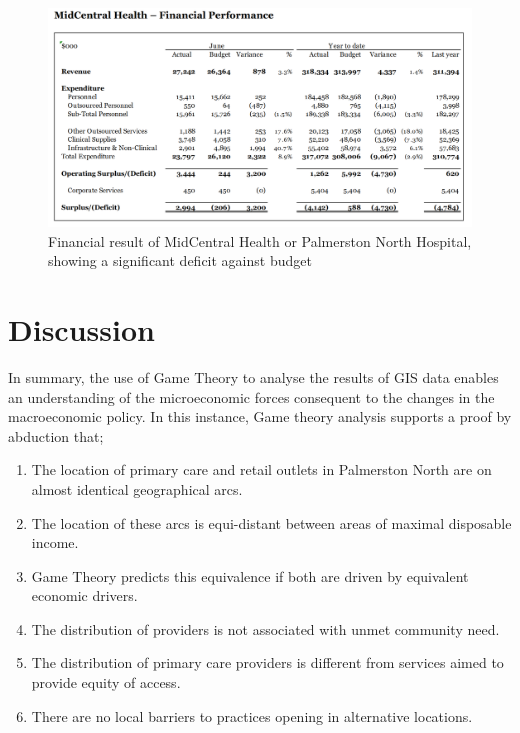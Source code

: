 \documentclass[11pt,a4paper]{article}
\begin{document}
\begin{figure}[htp]
\centering
\includegraphics[scale=0.30]{MCHbalance.png}
\caption{Financial result of MidCentral Health or Palmerston North Hospital, showing a significant deficit against budget }
\label{Financial result for MidCentral Health - Palmerston North Hospital}
\end{figure}

\pagebreak

\section{Discussion}
In summary, the use of Game Theory to analyse the results of GIS data enables an understanding of the microeconomic forces consequent to the changes in the macroeconomic policy. In this instance, Game theory analysis supports a proof by abduction that;

\begin{enumerate}
\item The location of primary care and retail outlets in Palmerston North are on almost identical geographical arcs.
\item The location of these arcs is equi-distant between areas of maximal disposable income.
\item Game Theory predicts this equivalence if both are driven by equivalent economic drivers.
\item The distribution of providers is not associated with unmet community need.
\item The distribution of primary care providers is different from services aimed to provide equity of access.
\item There are no local barriers to practices opening in alternative locations.
\end{enumerate}
\end{document}
